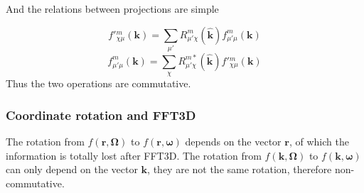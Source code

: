 And the relations between projections are simple

\[
f'{}_{\chi\mu}^{m}(\mathbf{k})=\sum_{\mu'}R_{\mu'\chi}^{m}(\hat{\mathbf{k}})f_{\mu'\mu}^{m}(\mathbf{k})
\]
\[
f_{\mu'\mu}^{m}(\mathbf{k})=\sum_{\chi}R_{\mu'\chi}^{m*}(\hat{\mathbf{k}})f'{}_{\chi\mu}^{m}(\mathbf{k})
\]
Thus the two operations are commutative.


\subsubsection{Coordinate rotation and FFT3D}

The rotation from $f(\mathbf{r},\mathbf{\Omega})$ to $f(\mathbf{r},\boldsymbol{\omega})$
depends on the vector $\mathbf{r}$, of which the information is totally
lost after FFT3D. The rotation from $f(\mathbf{k},\mathbf{\Omega})$
to $f(\mathbf{k},\boldsymbol{\omega})$ can only depend on the vector
$\mathbf{k}$, they are not the same rotation, therefore non-commutative. 
